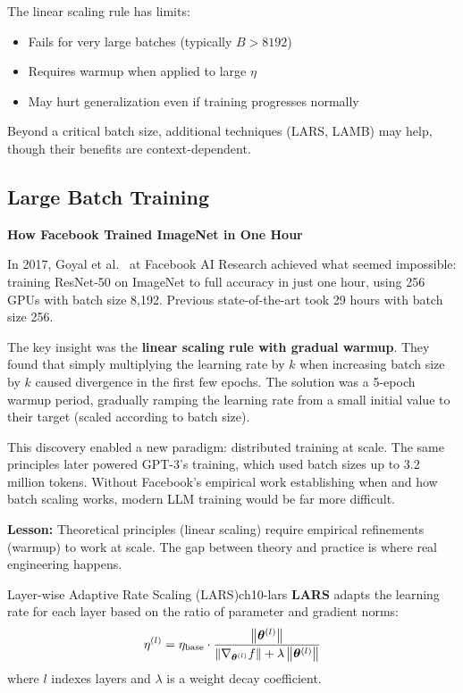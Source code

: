 \documentclass[../../main.tex]{subfiles}
\begin{document}
\begin{important}
The linear scaling rule has limits:
\begin{itemize}
    \item Fails for very large batches (typically $B > 8192$)
    \item Requires warmup when applied to large $\eta$
    \item May hurt generalization even if training progresses normally
\end{itemize}
Beyond a critical batch size, additional techniques (LARS, LAMB) may help, though their benefits are context-dependent.
\end{important}

\subsection{Large Batch Training}

\begin{warstory}
\textbf{How Facebook Trained ImageNet in One Hour}

In 2017, Goyal et al.~\cite{goyal2017accurate} at Facebook AI Research achieved what seemed impossible: training ResNet-50 on ImageNet to full accuracy in just one hour, using 256 GPUs with batch size 8,192. Previous state-of-the-art took 29 hours with batch size 256.

The key insight was the \textbf{linear scaling rule with gradual warmup}. They found that simply multiplying the learning rate by $k$ when increasing batch size by $k$ caused divergence in the first few epochs. The solution was a 5-epoch warmup period, gradually ramping the learning rate from a small initial value to their target (scaled according to batch size).

This discovery enabled a new paradigm: distributed training at scale. The same principles later powered GPT-3's training, which used batch sizes up to 3.2 million tokens. Without Facebook's empirical work establishing when and how batch scaling works, modern LLM training would be far more difficult.

\textbf{Lesson:} Theoretical principles (linear scaling) require empirical refinements (warmup) to work at scale. The gap between theory and practice is where real engineering happens.
\end{warstory}

\begin{definition}{Layer-wise Adaptive Rate Scaling (LARS)}{ch10-lars}
\textbf{LARS} adapts the learning rate for each layer based on the ratio of parameter and gradient norms:
\[
    \eta^{(l)} = \eta_{\text{base}} \cdot \frac{\left\lVert \boldsymbol{\theta}^{(l)} \right\rVert}{\left\lVert \nabla_{\boldsymbol{\theta}^{(l)}} f \right\rVert + \lambda \left\lVert \boldsymbol{\theta}^{(l)} \right\rVert}
\]
where $l$ indexes layers and $\lambda$ is a weight decay coefficient.
\end{definition}
\end{document}
